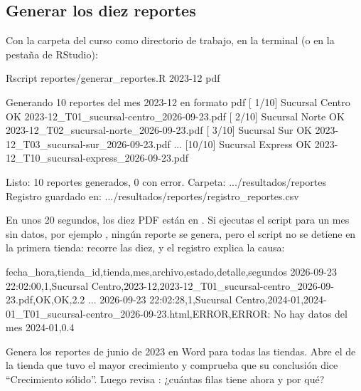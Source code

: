 \subsection{Generar los diez reportes}

Con la carpeta del curso como directorio de trabajo, en la terminal
(o en la pestaña  de RStudio):

\begin{textocodigo}
Rscript reportes/generar_reportes.R 2023-12 pdf
\end{textocodigo}

\begin{textocodigo}[title=Salida real del script]
Generando 10 reportes del mes 2023-12 en formato pdf
  [ 1/10] Sucursal Centro    OK    2023-12_T01_sucursal-centro_2026-09-23.pdf
  [ 2/10] Sucursal Norte     OK    2023-12_T02_sucursal-norte_2026-09-23.pdf
  [ 3/10] Sucursal Sur       OK    2023-12_T03_sucursal-sur_2026-09-23.pdf
  ...
  [10/10] Sucursal Express   OK    2023-12_T10_sucursal-express_2026-09-23.pdf

Listo: 10 reportes generados, 0 con error. Carpeta: .../resultados/reportes
Registro guardado en: .../resultados/reportes/registro_reportes.csv
\end{textocodigo}

En unos 20 segundos, los diez PDF están en .
Si ejecutas el script para un mes sin datos, por ejemplo
, ningún reporte se
genera, pero el script no se detiene en la primera tienda: recorre las diez,
y el registro explica la causa:

\begin{textocodigo}[title=resultados/reportes/registro\_reportes.csv (extracto)]
fecha_hora,tienda_id,tienda,mes,archivo,estado,detalle,segundos
2026-09-23 22:02:00,1,Sucursal Centro,2023-12,2023-12_T01_sucursal-centro_2026-09-23.pdf,OK,OK,2.2
...
2026-09-23 22:02:28,1,Sucursal Centro,2024-01,2024-01_T01_sucursal-centro_2026-09-23.html,ERROR,ERROR: No hay datos del mes 2024-01,0.4
\end{textocodigo}

\begin{hazlotu}
Genera los reportes de junio de 2023 en Word para todas las tiendas. Abre el
de la tienda que tuvo el mayor crecimiento y comprueba que su conclusión
dice ``Crecimiento sólido''. Luego revisa :
¿cuántas filas tiene ahora y por qué?
\end{hazlotu}

